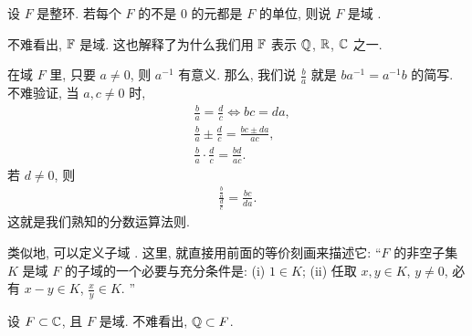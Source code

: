 \begin{definition}
    设 $F$ 是整环. 若每个 $F$ 的不是 $0$ 的元都是 $F$ 的单位, 则说 $F$ 是域 .
\end{definition}

\begin{example}
    不难看出, $\mathbb{F}$ 是域. 这也解释了为什么我们用 $\mathbb{F}$ 表示 $\mathbb{Q}$, $\mathbb{R}$, $\mathbb{C}$ 之一.
\end{example}

\begin{remark}
    在域 $F$ 里, 只要 $a \neq 0$, 则 $a^{-1}$ 有意义. 那么, 我们说 $\frac{b}{a}$ 就是 $ba^{-1} = a^{-1}b$ 的简写. 不难验证, 当 $a,c \neq 0$ 时,
    \begin{align*}
         & \frac{b}{a} = \frac{d}{c} \iff bc = da,             \\
         & \frac{b}{a} \pm \frac{d}{c} = \frac{bc \pm da}{ac}, \\
         & \frac{b}{a} \cdot \frac{d}{c} = \frac{bd}{ac}.
    \end{align*}
    若 $d \neq 0$, 则
    \begin{align*}
        \frac{\frac{b}{a}}{\frac{d}{c}} = \frac{bc}{da}.
    \end{align*}
    这就是我们熟知的分数运算法则.
\end{remark}

\begin{remark}
    类似地, 可以定义子域 . 这里, 就直接用前面的等价刻画来描述它: ``$F$ 的非空子集 $K$ 是域 $F$ 的子域的一个必要与充分条件是: (i) $1 \in K$; (ii) 任取 $x,y \in K$, $y \neq 0$, 必有 $x-y \in K$, $\frac{x}{y} \in K$. ''
\end{remark}

\begin{example}
    设 $F \subset \mathbb{C}$, 且 $F$ 是域. 不难看出, $\mathbb{Q} \subset F$.
\end{example}
